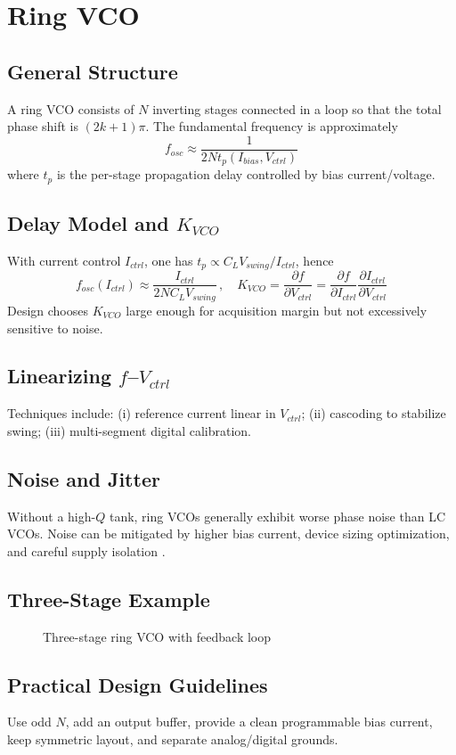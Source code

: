 \chapter{Ring VCO}
\section{General Structure}
A ring VCO consists of \(N\) inverting stages connected in a loop so that the total phase shift is \((2k+1)\pi\). The fundamental frequency is approximately
\[
f_{osc} \approx \frac{1}{2 N t_{p}(I_{bias}, V_{ctrl})}
\]
where \(t_p\) is the per-stage propagation delay controlled by bias current/voltage.

\section{Delay Model and \(K_{VCO}\)}
With current control \(I_{ctrl}\), one has \(t_p \propto C_L V_{swing}/I_{ctrl}\), hence
\[
f_{osc}(I_{ctrl}) \approx \frac{I_{ctrl}}{2 N C_L V_{swing}}\,,\quad K_{VCO} = \frac{\partial f}{\partial V_{ctrl}} = \frac{\partial f}{\partial I_{ctrl}}\frac{\partial I_{ctrl}}{\partial V_{ctrl}}
\]
Design chooses \(K_{VCO}\) large enough for acquisition margin but not excessively sensitive to noise.

\section{Linearizing \(f\)–\(V_{ctrl}\)}
Techniques include: (i) reference current linear in \(V_{ctrl}\); (ii) cascoding to stabilize swing; (iii) multi-segment digital calibration.

\section{Noise and Jitter}
Without a high-\(Q\) tank, ring VCOs generally exhibit worse phase noise than LC VCOs. Noise can be mitigated by higher bias current, device sizing optimization, and careful supply isolation \cite{razavi_rf}.

\section{Three-Stage Example}
\begin{figure}[H]
  \centering
  \caption{Three-stage ring VCO with feedback loop}
\end{figure}

\section{Practical Design Guidelines}
Use odd \(N\), add an output buffer, provide a clean programmable bias current, keep symmetric layout, and separate analog/digital grounds.


